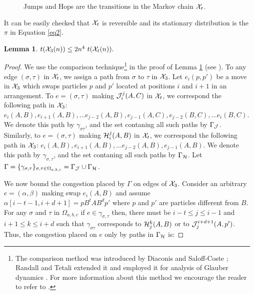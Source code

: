 \documentclass[10 pt]{article}
\newcommand{\EX}{{\cal X}}
\newcommand{\J}{{\cal J}}
\newcommand{\Ho}{{\cal H}}
\newtheorem{lemma}[thm]{Lemma}
\begin{document}
\begin{figure}[!h]

\centerline{}
\caption{Jumps and Hops are the transitions  in the Markov chain $\EX_t$.}\label{figJH}
\end{figure}



It can be easily checked that $\EX_t$ is reversible and its stationary distribution is the $\pi$ in Equation \ref{eq2}.

\begin{lemma}\label{lem1}
$t(\EX_3(n))\leq 2n^4 ~ t(\EX_t(n)).$
\end{lemma}

\begin{proof}

We use the comparison technique\footnote{
The comparison method was introduced by Diaconis and Saloff-Coste \cite{ComparisonMethodDiaconis}; Randall and Tetali extended it and employed
it for analysis of Glauber dynamics \cite{compare}.  For more information about this method we encourage the reader to refer to \cite{MCBook}.
}
 in the proof of Lemma \ref{lem1} (see \cite{ComparisonMethodDiaconis, compare}). To any edge $(\sigma,\tau)$ in $\EX_t$, we assign a path
from $\sigma$ to $\tau$ in $\EX_3$.  Let $e_{i}(p,p')$ be a move in $\EX_3$ which swaps particles $p$ and $p'$ located at positions
$i$ and $i+1$ in an arrangement. To  $e= (\sigma,\tau)$ making $\J_{i}^j(A,C)$ in $\EX_{t}$, we correspond the following path in $\EX_3$:
$e_i(A,B) , e_{i+1}(A,B),\dots e_{j-2}(A,B), e_{j-1}(A,C), e_{j-2}(B,C),\dots e_{i}(B,C)  $. We denote this path by $\gamma_{\sigma\tau}$,
and the set contaning all such paths by  $\Gamma_{\J}$. 
Similarly, to  $e= (\sigma,\tau)$ making $\Ho_{i}^j(A,B)$ in $\EX_{t}$, we correspond the following path in $\EX_3$:
$e_i(A,B) , e_{i+1}(A,B),\dots e_{j-2}(A,B), e_{j-1}(A,B) $. We denote this path by $\gamma_{\sigma,\tau}$, and the set contaning all such
paths by $\Gamma_{\Ho}$. Let $\Gamma=\{ \gamma_{\sigma,\tau}\}_{\sigma,\tau\in \Omega_{a,b,c}}=\Gamma_{\J}\cup \Gamma_{\Ho}$.


We now bound the congestion placed by $\Gamma$ on edges of $\EX_3$.
Consider an arbitrary $e=(\alpha,\beta)$  making swap $e_i(A,B)$ and assume $\alpha[i-t-1,i+d+1]=pB^tAB^{d}p'$ where $p$ and
$p'$ are particles different from $B$. For any $\sigma$ and $\tau$ in $\Omega_{a,b,c}$ if $e\in \gamma_{\sigma,\tau}$ then,
there must be  $i-t\leq j\leq i-1$ and $i+1\leq k\leq i+d$ such that $\gamma_{\sigma \tau}$ corresponds to $\Ho_{j}^k(A,B)$ or
to $\J_{j}^{i+d+1}(A,p')$. Thus, the congestion placed on $e$ only by paths in $\Gamma_{\Ho}$ is:


\end{proof}
\end{document}
